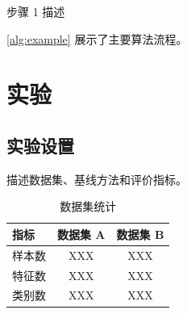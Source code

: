 \documentclass[macnew, cn]{manuscript}
\begin{document}
\begin{algorithm}[t]
    步骤 1 描述\\
    \caption{算法名称}
    \label{alg:example}
\end{algorithm}

\cref{alg:example} 展示了主要算法流程。

\section{实验}
\label{sec:exp}

\subsection{实验设置}
\label{subsec:setup}

描述数据集、基线方法和评价指标。

\begin{table}[t]
    \centering
    \caption{数据集统计}
    \label{tab:data}
    \begin{tabular}{lcc}
        \toprule
        指标 & 数据集 A & 数据集 B \\
        \midrule
        样本数 & XXX & XXX \\
        特征数 & XXX & XXX \\
        类别数 & XXX & XXX \\
        \bottomrule
    \end{tabular}
\end{table}
\end{document}
